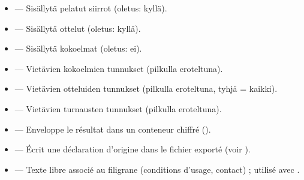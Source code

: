 \documentclass[letterpaper,10pt,finnish]{sphinxmanual}
\begin{document}
\begin{itemize}
\item {} 
\sphinxAtStartPar
{} — Sisällytä pelatut siirrot (oletus: kyllä).

\item {} 
\sphinxAtStartPar
{} — Sisällytä ottelut (oletus: kyllä).

\item {} 
\sphinxAtStartPar
{} — Sisällytä kokoelmat (oletus: ei).

\item {} 
\sphinxAtStartPar
{} — Vietävien kokoelmien tunnukset (pilkulla eroteltuna).

\item {} 
\sphinxAtStartPar
{} — Vietävien otteluiden tunnukset (pilkulla eroteltuna, tyhjä = kaikki).

\item {} 
\sphinxAtStartPar
{} — Vietävien turnausten tunnukset (pilkulla eroteltuna).

\item {} 
\sphinxAtStartPar
{} — Enveloppe le résultat dans un conteneur chiffré ().

\item {} 
\sphinxAtStartPar
{} — Écrit une déclaration d’origine  dans le fichier
exporté (voir {\hyperref[\detokenize{manuel:diffusion-controlee}]{}}).

\item {} 
\sphinxAtStartPar
{} — Texte libre associé au filigrane (conditions
d’usage, contact) ; utilisé avec .

\end{itemize}

\sphinxAtStartPar
{}
\end{document}
